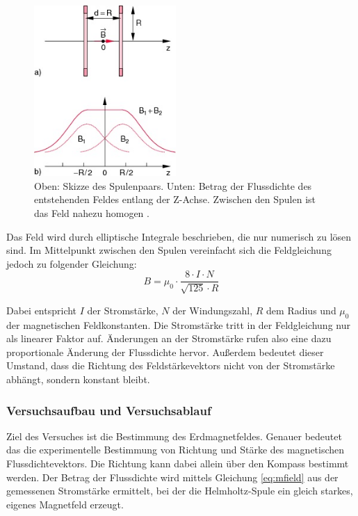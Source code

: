 \begin{figure}
	\centering
	\includegraphics[width=0.48\textwidth]{images/papers/BiotSavart.jpg}
	\caption{Oben: Skizze des Spulenpaars. Unten: Betrag der Flussdichte des entstehenden Feldes entlang der Z-Achse. Zwischen den Spulen ist das Feld nahezu homogen \cite{Demtroder13}.}
	\label{img:hh-mfeld}
\end{figure}


Das Feld wird durch elliptische Integrale beschrieben, die nur numerisch zu lösen sind. Im Mittelpunkt zwischen den Spulen vereinfacht sich die Feldgleichung jedoch zu folgender Gleichung:
\begin{equation}
\label{eq:mfield}
B = \mu_{0} \cdot \frac{8 \cdot I \cdot N}{\sqrt{125} \cdot R}
\end{equation}

Dabei entspricht $I$ der Stromstärke, $N$ der Windungszahl, $R$ dem Radius und $\mu_{0}$ der magnetischen Feldkonstanten. Die Stromstärke tritt in der Feldgleichung nur als linearer Faktor auf. Änderungen an der Stromstärke rufen also eine dazu proportionale Änderung der Flussdichte hervor. Außerdem bedeutet dieser Umstand, dass die Richtung des Feldstärkevektors nicht von der Stromstärke abhängt, sondern konstant bleibt.\\

\subsubsection{Versuchsaufbau und Versuchsablauf}
\label{sec-2-3-4}
Ziel des Versuches ist die Bestimmung des Erdmagnetfeldes. Genauer bedeutet das die experimentelle Bestimmung von Richtung und Stärke des magnetischen Flussdichtevektors. Die Richtung kann dabei allein über den Kompass bestimmt werden. Der Betrag der Flussdichte wird mittels Gleichung \ref{eq:mfield} aus der gemessenen Stromstärke ermittelt, bei der die Helmholtz-Spule ein gleich starkes, eigenes Magnetfeld erzeugt.\\

